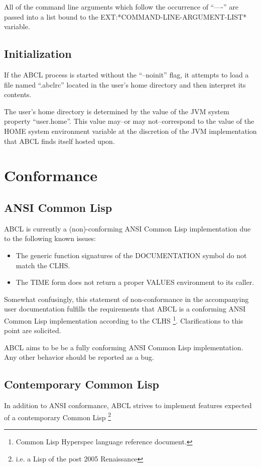 \documentclass[10pt]{book}
\begin{document}
All of the command line arguments which follow the occurrence of ``----''
are passed into a list bound to the EXT:*COMMAND-LINE-ARGUMENT-LIST*
variable.

\section{Initialization}

If the \textsc{ABCL} process is started without the ``--noinit'' flag, it
attempts to load a file named ``.abclrc'' located in the user's home
directory and then interpret its contents.  

The user's home directory is determined by the value of the JVM system
property ``user.home''.  This value may--or may not--correspond to the
value of the HOME system environment variable at the discretion of the
JVM implementation that \textsc{ABCL} finds itself hosted upon.

\chapter{Conformance}
\label{chapter:conformance}

\section{ANSI Common Lisp}
\textsc{ABCL} is currently a (non)-conforming ANSI Common Lisp
implementation due to the following known issues:

\begin{itemize}
  \item The generic function signatures of the DOCUMENTATION symbol do
    not match the CLHS.
  \item The TIME form does not return a proper VALUES environment to
    its caller.
\end{itemize}

Somewhat confusingly, this statement of non-conformance in the
accompanying user documentation fulfills the requirements that
\textsc{ABCL} is a conforming ANSI Common Lisp implementation
according to the CLHS \footnote{Common Lisp Hyperspec language
  reference document.}.  Clarifications to this point are solicited.

ABCL aims to be be a fully conforming ANSI Common Lisp implementation.
Any other behavior should be reported as a bug.

\section{Contemporary Common Lisp}
In addition to ANSI conformance, \textsc{ABCL} strives to implement features
expected of a contemporary Common Lisp \footnote{i.e. a Lisp of the
  post 2005 Renaissance}
\end{document}
